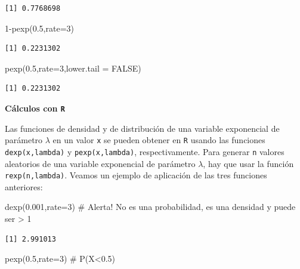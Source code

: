 \documentclass[
  letterpaper,
  DIV=11,
  numbers=noendperiod]{scrreprt}
\newenvironment{Shaded}{\begin{snugshade}}{\end{snugshade}}
\newcommand{\AttributeTok}[1]{\textcolor[rgb]{0.40,0.45,0.13}{#1}}
\newcommand{\CommentTok}[1]{\textcolor[rgb]{0.37,0.37,0.37}{#1}}
\newcommand{\ConstantTok}[1]{\textcolor[rgb]{0.56,0.35,0.01}{#1}}
\newcommand{\DecValTok}[1]{\textcolor[rgb]{0.68,0.00,0.00}{#1}}
\newcommand{\FloatTok}[1]{\textcolor[rgb]{0.68,0.00,0.00}{#1}}
\newcommand{\FunctionTok}[1]{\textcolor[rgb]{0.28,0.35,0.67}{#1}}
\newcommand{\NormalTok}[1]{\textcolor[rgb]{0.00,0.23,0.31}{#1}}
\newcommand{\SpecialCharTok}[1]{\textcolor[rgb]{0.37,0.37,0.37}{#1}}
\begin{document}
\begin{verbatim}
[1] 0.7768698
\end{verbatim}

\begin{Shaded}
\begin{Highlighting}[]
\DecValTok{1}\SpecialCharTok{{-}}\FunctionTok{pexp}\NormalTok{(}\FloatTok{0.5}\NormalTok{,}\AttributeTok{rate=}\DecValTok{3}\NormalTok{)}
\end{Highlighting}
\end{Shaded}

\begin{verbatim}
[1] 0.2231302
\end{verbatim}

\begin{Shaded}
\begin{Highlighting}[]
\FunctionTok{pexp}\NormalTok{(}\FloatTok{0.5}\NormalTok{,}\AttributeTok{rate=}\DecValTok{3}\NormalTok{,}\AttributeTok{lower.tail =} \ConstantTok{FALSE}\NormalTok{)}
\end{Highlighting}
\end{Shaded}

\begin{verbatim}
[1] 0.2231302
\end{verbatim}

\textbf{Cálculos con \texttt{R}}

Las funciones de densidad y de distribución de una variable exponencial
de parámetro \(\lambda\) en un valor \texttt{x} se pueden obtener en
\texttt{R} usando las funciones \texttt{dexp(x,lambda)} y
\texttt{pexp(x,lambda)}, respectivamente. Para generar \texttt{n}
valores aleatorios de una variable exponencial de parámetro \(\lambda\),
hay que usar la función \texttt{rexp(n,lambda)}. Veamos un ejemplo de
aplicación de las tres funciones anteriores:

\begin{Shaded}
\begin{Highlighting}[]
\FunctionTok{dexp}\NormalTok{(}\FloatTok{0.001}\NormalTok{,}\AttributeTok{rate=}\DecValTok{3}\NormalTok{) }\CommentTok{\# Alerta! No es una probabilidad, es una densidad y puede ser \textgreater{} 1}
\end{Highlighting}
\end{Shaded}

\begin{verbatim}
[1] 2.991013
\end{verbatim}

\begin{Shaded}
\begin{Highlighting}[]
\FunctionTok{pexp}\NormalTok{(}\FloatTok{0.5}\NormalTok{,}\AttributeTok{rate=}\DecValTok{3}\NormalTok{) }\CommentTok{\# P(X\textless{}0.5)}
\end{Highlighting}
\end{Shaded}
\end{document}
